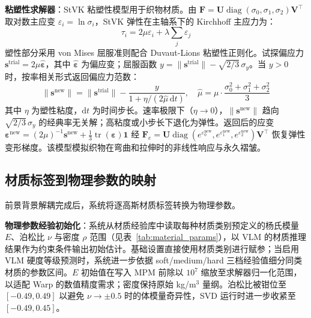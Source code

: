 \textbf{粘塑性求解器}：StVK 粘塑性模型用于织物材质。由 $\mathbf{F}=\mathbf{U}\operatorname{diag}(\sigma_0,\sigma_1,\sigma_2)\mathbf{V}^{\top}$ 取对数主应变 $\varepsilon_i=\ln\sigma_i$，StVK 弹性在主轴系下的 Kirchhoff 主应力为：
\begin{equation}
\tau_i=2\mu\varepsilon_i+\lambda\sum_j\varepsilon_j
\end{equation}
塑性部分采用 von Mises 屈服准则配合 Duvaut-Lions 粘塑性正则化。试探偏应力 $\mathbf{s}^{\text{trial}}=2\mu\hat{\boldsymbol{\varepsilon}}$，其中 $\hat{\boldsymbol{\varepsilon}}$ 为偏应变；屈服函数 $y=\|\mathbf{s}^{\text{trial}}\|-\sqrt{2/3}\,\sigma_y$。当 $y>0$ 时，按率相关形式返回偏应力范数：
\begin{equation}
\|\mathbf{s}^{\text{new}}\|=\|\mathbf{s}^{\text{trial}}\|-\frac{y}{1+\eta/(2\hat{\mu}\,\mathrm{d}t)},\quad
\hat{\mu}=\mu\cdot\frac{\sigma_0^2+\sigma_1^2+\sigma_2^2}{3}
\end{equation}
其中 $\eta$ 为塑性粘度，$\mathrm{d}t$ 为时间步长。速率极限下（$\eta\to0$），$\|\mathbf{s}^{\text{new}}\|$ 趋向 $\sqrt{2/3}\,\sigma_y$ 的经典率无关解；高粘度或小步长下退化为弹性。返回后的应变 $\boldsymbol{\varepsilon}^{\text{new}}=(2\mu)^{-1}\mathbf{s}^{\text{new}}+\frac{1}{3}\operatorname{tr}(\boldsymbol{\varepsilon})\mathbf{1}$ 经 $\mathbf{F}_e=\mathbf{U}\operatorname{diag}(e^{\varepsilon_0^{\text{new}}},e^{\varepsilon_1^{\text{new}}},e^{\varepsilon_2^{\text{new}}})\mathbf{V}^{\top}$ 恢复弹性变形梯度。该模型模拟织物在弯曲和拉伸时的非线性响应与永久褶皱。

\subsection{材质标签到物理参数的映射}
前景背景解耦完成后，系统将逐高斯材质标签转换为物理参数。

\textbf{物理参数经验初始化}：系统从材质经验库中读取每种材质类别预定义的杨氏模量 $E$、泊松比 $\nu$ 与密度 $\rho$ 范围（见表~\ref{tab:material_params}），以 VLM 的材质推理结果作为约束条件输出初始估计。基础设置直接使用材质类别进行赋参；当启用 VLM 硬度等级预测时，系统进一步依据 soft/medium/hard 三档经验值细分同类材质的参数区间。$E$ 初始值在写入 MPM 前除以 $10^7$ 缩放至求解器归一化范围，以适配 Warp 的数值精度需求；密度保持原始 kg/m$^3$ 量纲。泊松比被钳位至 $[-0.49, 0.49]$ 以避免 $\nu\to\pm0.5$ 时的体模量奇异性，SVD 运行时进一步收紧至 $[-0.49, 0.45]$。

